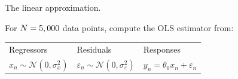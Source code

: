 \begin{frame}{The linear approximation.}

For $N=5,000$ data points, compute the OLS estimator from:
%

\vspace{1em}
\begin{tabularx}{\textwidth}{YYY}
    Regressors  &   Residuals   &   Responses \\
    $x_n \sim \mathcal{N}(0, \sigma_x^2)$   &
    $\varepsilon_n \sim \mathcal{N}(0, \sigma_\varepsilon^2)$   &
    $y_n = \theta_0 x_n + \varepsilon_n$
\end{tabularx}
%
%

\SimApproxNormalGraph{}

\end{frame}
